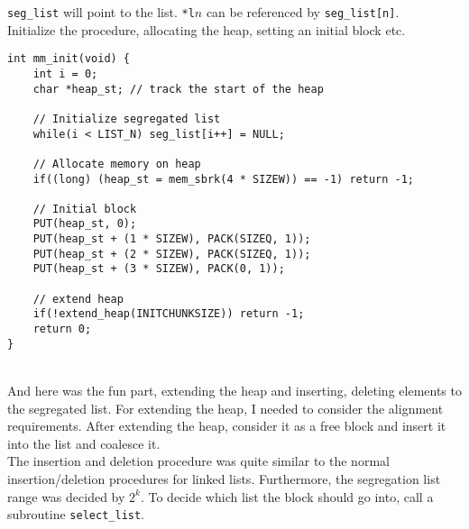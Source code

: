 \documentclass[12pt]{report}
\begin{document}
\texttt{seg\_list} will point to the list. \texttt{*l}$n$ can be referenced by \texttt{seg\_list[n]}.\\
Initialize the procedure, allocating the heap, setting an initial block etc.
\begin{lstlisting}[style=Cstyle]
int mm_init(void) {
	int i = 0;
	char *heap_st; // track the start of the heap
	
	// Initialize segregated list
	while(i < LIST_N) seg_list[i++] = NULL;
	
	// Allocate memory on heap
	if((long) (heap_st = mem_sbrk(4 * SIZEW)) == -1) return -1;
	
	// Initial block
	PUT(heap_st, 0);
	PUT(heap_st + (1 * SIZEW), PACK(SIZEQ, 1));
	PUT(heap_st + (2 * SIZEW), PACK(SIZEQ, 1));
	PUT(heap_st + (3 * SIZEW), PACK(0, 1));
	
	// extend heap
	if(!extend_heap(INITCHUNKSIZE)) return -1;
	return 0;
}
\end{lstlisting}~\\
And here was the fun part, extending the heap and inserting, deleting elements to the segregated list. For extending the heap, I needed to consider the alignment requirements. After extending the heap, consider it as a free block and insert it into the list and coalesce it.\\
The insertion and deletion procedure was quite similar to the normal insertion/deletion procedures for linked lists. Furthermore, the segregation list range was decided by $2^k$. To decide which list the block should go into, call a subroutine \texttt{select\_list}.
\end{document}
